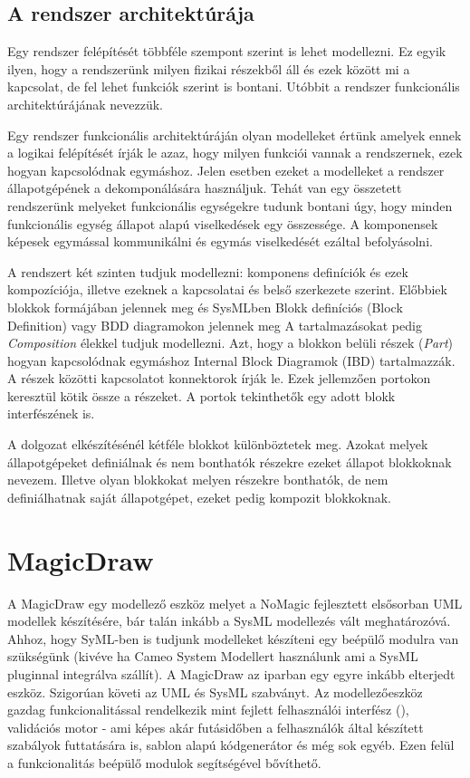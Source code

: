 \subsection{A rendszer architektúrája}
Egy rendszer felépítését többféle szempont szerint is lehet modellezni. Ez egyik ilyen, hogy a rendszerünk milyen fizikai részekből áll és ezek között mi a kapcsolat, de fel lehet funkciók szerint is bontani. Utóbbit a rendszer funkcionális architektúrájának nevezzük.

Egy rendszer funkcionális architektúráján olyan modelleket értünk amelyek ennek a logikai felépítését írják le azaz, hogy milyen funkciói vannak a rendszernek, ezek hogyan kapcsolódnak egymáshoz. Jelen esetben ezeket a modelleket a rendszer állapotgépének a dekomponálására használjuk. Tehát van egy összetett rendszerünk melyeket funkcionális egységekre tudunk bontani úgy, hogy minden funkcionális egység állapot alapú viselkedések egy összessége. A komponensek képesek egymással kommunikálni és egymás viselkedését ezáltal befolyásolni.

A rendszert két szinten tudjuk modellezni: komponens definíciók és ezek kompozíciója, illetve ezeknek a kapcsolatai és belső szerkezete szerint. Előbbiek blokkok formájában jelennek meg és SysMLben Blokk definíciós (Block Definition) vagy BDD diagramokon jelennek meg A tartalmazásokat pedig \emph{Composition} élekkel tudjuk modellezni. Azt, hogy a blokkon belüli részek (\emph{Part}) hogyan kapcsolódnak egymáshoz Internal Block Diagramok (IBD) tartalmazzák. A részek közötti kapcsolatot konnektorok írják le. Ezek jellemzően portokon keresztül kötik össze a részeket. A portok tekinthetők egy adott blokk interfészének is.

A dolgozat elkészítésénél kétféle blokkot különböztetek meg. Azokat melyek állapotgépeket definiálnak és nem bonthatók részekre ezeket állapot blokkoknak nevezem. Illetve olyan blokkokat melyen részekre bonthatók, de nem definiálhatnak saját állapotgépet, ezeket pedig kompozit blokkoknak.

\section{MagicDraw}

A MagicDraw egy modellező eszköz melyet a NoMagic fejlesztett elsősorban UML modellek készítésére, bár talán inkább a SysML modellezés vált meghatározóvá. Ahhoz, hogy SyML-ben is tudjunk modelleket készíteni egy beépülő modulra van szükségünk (kivéve ha Cameo System Modellert használunk ami a SysML pluginnal integrálva szállít). A MagicDraw az iparban egy egyre inkább elterjedt eszköz. Szigorúan követi az UML és SysML szabványt.
Az modellezőeszköz gazdag funkcionalitással rendelkezik mint fejlett felhasználói interfész (), validációs motor - ami képes akár futásidőben a felhasználók által készített szabályok futtatására is, sablon alapú kódgenerátor és még sok egyéb. Ezen felül a funkcionalitás beépülő modulok segítségével bővíthető.

